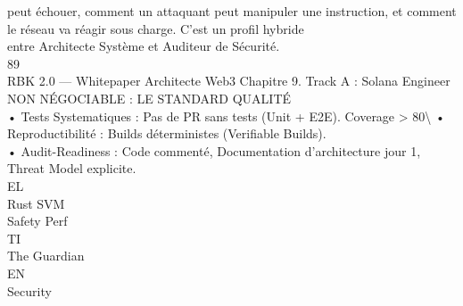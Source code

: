 \documentclass[12pt,landscape,a4paper]{article}
\begin{document}
peut échouer, comment un attaquant peut manipuler une instruction, et comment le réseau va réagir sous charge. C’est un profil hybride\\
entre Architecte Système et Auditeur de Sécurité.\\
\vspace{0.5em}
\vspace{0.5em}
\vspace{0.5em}
\vspace{0.5em}
89\\
RBK 2.0 — Whitepaper Architecte Web3                                                                    Chapitre 9. Track A : Solana Engineer\\
\vspace{0.5em}
\vspace{0.5em}
\vspace{0.5em}
NON NÉGOCIABLE : LE STANDARD QUALITÉ\\
• Tests Systematiques : Pas de PR sans tests (Unit + E2E). Coverage \textgreater{} 80\textbackslash{}%
\vspace{0.5em}
• Reproductibilité : Builds déterministes (Verifiable Builds).\\
\vspace{0.5em}
• Audit-Readiness : Code commenté, Documentation d’architecture jour 1, Threat Model explicite.\\
\vspace{0.5em}
\vspace{0.5em}
\vspace{0.5em}
\vspace{0.5em}
EL\\
Rust                      SVM\\
Safety                     Perf\\
\vspace{0.5em}
\vspace{0.5em}
\vspace{0.5em}
\vspace{0.5em}
TI\\
The Guardian\\
\vspace{0.5em}
\vspace{0.5em}
\vspace{0.5em}
\vspace{0.5em}
EN\\
Security\\
\vspace{0.5em}
\vspace{0.5em}
\end{document}
